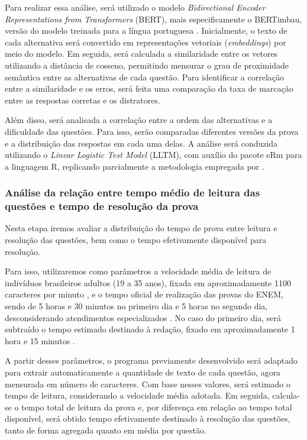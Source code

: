 \documentclass[a4paper,10pt, twocolumn]{article}
\begin{document}
Para realizar essa análise, será utilizado o modelo \textit{Bidirectional Encoder Representations from Transformers} (BERT), mais especificamente o BERTimbau, versão do modelo treinada para a língua portuguesa \cite{souza2019portuguese}. Inicialmente, o texto de cada alternativa será convertido em representações vetoriais (\textit{embeddings}) por meio do modelo. Em seguida, será calculada a similaridade entre os vetores utilizando a distância de cosseno, permitindo mensurar o grau de proximidade semântica entre as alternativas de cada questão. Para identificar a correlação entre a similaridade e os erros, será feita uma comparação da taxa de marcação entre as respostas corretas e os distratores.

Além disso, será analisada a correlação entre a ordem das alternativas e a dificuldade das questões. Para isso, serão comparadas diferentes versões da prova e a distribuição das respostas em cada uma delas. A análise será conduzida utilizando o \textit{Linear Logistic Test Model} (LLTM), com auxílio do pacote eRm para a linguagem R, replicando parcialmente a metodologia empregada por \textcite{hohensinn_does_nodate}.

\subsubsection{Análise da relação entre tempo médio de leitura das questões e tempo de resolução da prova}

Nesta etapa iremos avaliar a distribuição do tempo de prova entre leitura e resolução das questões, bem como o tempo efetivamente disponível para resolução.

Para isso, utilizaremos como parâmetros a velocidade média de leitura de indivíduos brasileiros adultos (19 a 35 anos), fixada em aproximadamente 1100 caracteres por minuto \cite{Messias2008}, e o tempo oficial de realização das provas do ENEM, sendo de 5 horas e 30 minutos no primeiro dia e 5 horas no segundo dia, desconsiderando atendimentos especializados \cite{inep_enem_servico}. No caso do primeiro dia, será subtraído o tempo estimado destinado à redação, fixado em aproximadamente 1 hora e 15 minutos \cite{brasil_escola_redacao_enem}.

A partir desses parâmetros, o programa previamente desenvolvido será adaptado para extrair automaticamente a quantidade de texto de cada questão, agora mensurada em número de caracteres. Com base nesses valores, será estimado o tempo de leitura, considerando a velocidade média adotada. Em seguida, calcula-se o tempo total de leitura da prova e, por diferença em relação ao tempo total disponível, será obtido tempo efetivamente destinado à resolução das questões, tanto de forma agregada quanto em média por questão.
\end{document}
